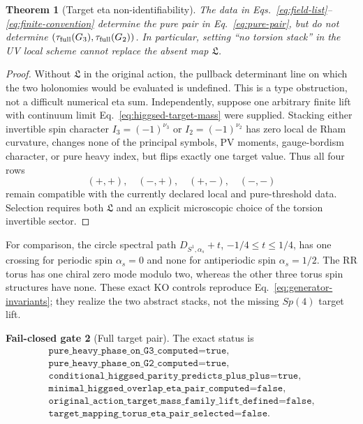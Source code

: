 \documentclass[11pt]{article}
\newtheorem{theorem}{Theorem}[section]
\theoremstyle{definition}
\newtheorem{gate}[theorem]{Fail-closed gate}
\theoremstyle{remark}
\begin{document}
\begin{theorem}[Target eta non-identifiability]
The data in Eqs.~\eqref{eq:field-list}--\eqref{eq:finite-convention} determine
the pure pair in Eq.~\eqref{eq:pure-pair}, but do not determine
\((\tau_{\rm full}(G_3),\tau_{\rm full}(G_2))\).  In particular, setting
``no torsion stack'' in the UV local scheme cannot replace the absent map
\(\mathfrak L\).
\end{theorem}
\begin{proof}
Without \(\mathfrak L\) in the original action, the pullback determinant line on which the two
holonomies would be evaluated is undefined.  This is a type obstruction,
not a difficult numerical eta sum.  Independently, suppose one arbitrary
finite lift with continuum limit Eq.~\eqref{eq:higgsed-target-mass} were
supplied.  Stacking either invertible spin character
\(I_3=(-1)^{\nu_3}\) or \(I_2=(-1)^{\nu_2}\) has zero local de Rham
curvature, changes none of the principal symbols, PV moments, gauge-bordism
character, or pure heavy index, but flips exactly one target value.  Thus
all four rows
\[
 (+,+),\quad(-,+),\quad(+,-),\quad(-,-)
\]
remain compatible with the currently declared local and pure-threshold
data.  Selection requires both \(\mathfrak L\) and an explicit microscopic
choice of the torsion invertible sector.
\end{proof}

For comparison, the circle spectral path
\(D_{S^1,\alpha_s}+t\), \(-1/4\le t\le1/4\), has one crossing for periodic
spin \(\alpha_s=0\) and none for antiperiodic spin \(\alpha_s=1/2\).  The
RR torus has one chiral zero mode modulo two, whereas the other three torus
spin structures have none.  These exact KO controls reproduce
Eq.~\eqref{eq:generator-invariants}; they realize the two abstract stacks,
not the missing \(Sp(4)\) target lift.

\begin{gate}[Full target pair]
The exact status is
\begin{equation}
 \begin{gathered}
 \texttt{pure\_heavy\_phase\_on\_G3\_computed=true},\\
 \texttt{pure\_heavy\_phase\_on\_G2\_computed=true},\\
 \texttt{conditional\_higgsed\_parity\_predicts\_plus\_plus=true},\\
 \texttt{minimal\_higgsed\_overlap\_eta\_pair\_computed=false},\\
 \texttt{original\_action\_target\_mass\_family\_lift\_defined=false},\\
 \texttt{target\_mapping\_torus\_eta\_pair\_selected=false}.
 \end{gathered}
 \label{eq:target-gates}
\end{equation}
\end{gate}
\end{document}
